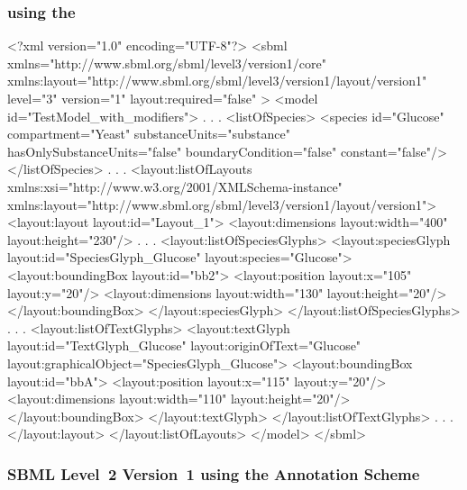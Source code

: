 \label{example:textglyph}
\subsubsection{\sbmlthreecore using the \LayoutPackage}
\begin{example}
<?xml version="1.0" encoding="UTF-8"?>
<sbml xmlns="http://www.sbml.org/sbml/level3/version1/core" 
		xmlns:layout="http://www.sbml.org/sbml/level3/version1/layout/version1" 
		level="3" version="1" layout:required="false" >		
  <model id="TestModel_with_modifiers">
                .
                .
                .
    <listOfSpecies>
      <species id="Glucose" compartment="Yeast" substanceUnits="substance" 
			hasOnlySubstanceUnits="false" boundaryCondition="false" constant="false"/>
    </listOfSpecies>
                .
                .
                .
    <layout:listOfLayouts xmlns:xsi="http://www.w3.org/2001/XMLSchema-instance" 
		xmlns:layout="http://www.sbml.org/sbml/level3/version1/layout/version1">
      <layout:layout layout:id="Layout_1">
        <layout:dimensions layout:width="400" layout:height="230"/>
                .
                .
                .
        <layout:listOfSpeciesGlyphs>
          <layout:speciesGlyph layout:id="SpeciesGlyph_Glucose"  layout:species="Glucose">
            <layout:boundingBox layout:id="bb2">
              <layout:position layout:x="105" layout:y="20"/>
              <layout:dimensions layout:width="130" layout:height="20"/>
            </layout:boundingBox>
          </layout:speciesGlyph>
        </layout:listOfSpeciesGlyphs>					
                .
                .
                .
        <layout:listOfTextGlyphs>
          <layout:textGlyph layout:id="TextGlyph_Glucose" 
			layout:originOfText="Glucose" 
			layout:graphicalObject="SpeciesGlyph_Glucose">
            <layout:boundingBox layout:id="bbA">
              <layout:position layout:x="115" layout:y="20"/>
              <layout:dimensions layout:width="110" layout:height="20"/>
            </layout:boundingBox>
          </layout:textGlyph>
        </layout:listOfTextGlyphs>
                .
                .
                .
			</layout:layout>
		</layout:listOfLayouts>
  </model>
</sbml>
\end{example}
\subsubsection{SBML Level~2 Version~1 using the Annotation Scheme}

